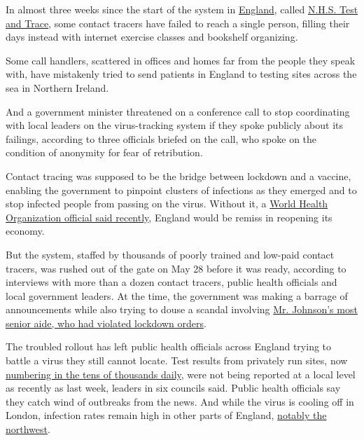 In almost three weeks since the start of the system in
\href{https://www.nytimes3xbfgragh.onion/2020/07/03/world/europe/britain-quarantine-us-coronavirus.html}{England},
called
\href{https://www.nhs.uk/conditions/coronavirus-covid-19/testing-and-tracing/nhs-test-and-trace-if-youve-been-in-contact-with-a-person-who-has-coronavirus/}{N.H.S.
Test and Trace}, some contact tracers have failed to reach a single
person, filling their days instead with internet exercise classes and
bookshelf organizing.

Some call handlers, scattered in offices and homes far from the people
they speak with, have mistakenly tried to send patients in England to
testing sites across the sea in Northern Ireland.

And a government minister threatened on a conference call to stop
coordinating with local leaders on the virus-tracking system if they
spoke publicly about its failings, according to three officials briefed
on the call, who spoke on the condition of anonymity for fear of
retribution.

Contact tracing was supposed to be the bridge between lockdown and a
vaccine, enabling the government to pinpoint clusters of infections as
they emerged and to stop infected people from passing on the virus.
Without it, a
\href{https://www.theguardian.com/world/2020/jun/14/who-cautions-against-further-lifting-lockdown-england}{World
Health Organization official said recently}, England would be remiss in
reopening its economy.

But the system, staffed by thousands of poorly trained and low-paid
contact tracers, was rushed out of the gate on May 28 before it was
ready, according to interviews with more than a dozen contact tracers,
public health officials and local government leaders. At the time, the
government was making a barrage of announcements while also trying to
douse a scandal involving
\href{https://www.nytimes3xbfgragh.onion/2020/05/23/world/europe/dominic-cummings-lockdown.html}{Mr.
Johnson's most senior aide, who had violated lockdown orders}.

The troubled rollout has left public health officials across England
trying to battle a virus they still cannot locate. Test results from
privately run sites, now
\href{https://www.gov.uk/guidance/coronavirus-covid-19-information-for-the-public}{numbering
in the tens of thousands daily}, were not being reported at a local
level as recently as last week, leaders in six councils said. Public
health officials say they catch wind of outbreaks from the news. And
while the virus is cooling off in London, infection rates remain high in
other parts of England,
\href{https://www.theguardian.com/world/2020/jun/07/what-is-coronavirus-r-number-and-is-it-rising-in-uk}{notably
the northwest}.

